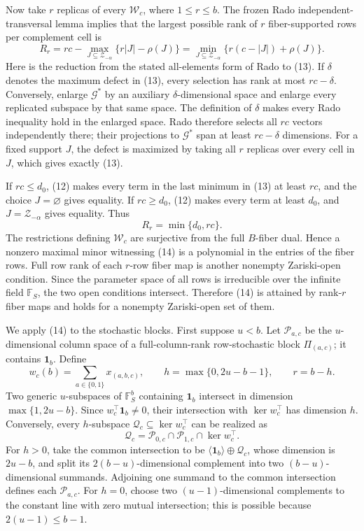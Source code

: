 Now take \(r\) replicas of every \(\mathscr W_c\), where \(1\le r\le b\).
The frozen Rado independent-transversal lemma implies that the largest possible
rank of \(r\) fiber-supported rows per complement cell is
\[
R_r=rc-\max_{J\subseteq\mathcal Z_{-\alpha}}
\{r\lvert J\rvert-\rho(J)\}
=\min_{J\subseteq\mathcal Z_{-\alpha}}
\{r(c-\lvert J\rvert)+\rho(J)\}.
\tag{13}
\]
Here is the reduction from the stated all-elements form of Rado to (13).  If
\(\delta\) denotes the maximum defect in (13), every selection has rank at most
\(rc-\delta\).  Conversely, enlarge \(\mathscr G^*\) by an auxiliary
\(\delta\)-dimensional space and enlarge every replicated subspace by that same
space.  The definition of \(\delta\) makes every Rado inequality hold in the
enlarged space.  Rado therefore selects all \(rc\) vectors independently there;
their projections to \(\mathscr G^*\) span at least \(rc-\delta\) dimensions.
For a fixed support \(J\), the defect is maximized by taking all \(r\) replicas
over every cell in \(J\), which gives exactly (13).

If \(rc\le d_0\), (12) makes every term in the last minimum in (13) at least
\(rc\), and the choice \(J=\varnothing\) gives equality.  If \(rc\ge d_0\),
(12) makes every term at least \(d_0\), and \(J=\mathcal Z_{-\alpha}\) gives
equality.  Thus
\[
R_r=\min\{d_0,rc\}.
\tag{14}
\]
The restrictions defining \(\mathscr W_c\) are surjective from the full
\(B\)-fiber dual.  Hence a nonzero maximal minor witnessing (14) is a polynomial
in the entries of the fiber rows.  Full row rank of each \(r\)-row fiber map is
another nonempty Zariski-open condition.  Since the parameter space of all rows
is irreducible over the infinite field \(\mathbb F_S\), the two open conditions
intersect.  Therefore (14) is attained by rank-\(r\) fiber maps and holds for a
nonempty Zariski-open set of them.

We apply (14) to the stochastic blocks.  First suppose \(u<b\).  Let
\(\mathscr P_{a,c}\) be the \(u\)-dimensional column space of a full-column-rank
row-stochastic block \(\Pi_{(a,c)}\); it contains \(\mathbf 1_b\).  Define
\[
w_c(b)=\sum_{a\in\{0,1\}}x_{(a,b,c)},
\qquad
h=\max\{0,2u-b-1\},
\qquad r=b-h.
\tag{15}
\]
Two generic \(u\)-subspaces of \(\mathbb F_S^b\) containing
\(\mathbf 1_b\) intersect in dimension \(\max\{1,2u-b\}\).  Since
\(w_c^\top\mathbf 1_b\ne0\), their intersection with
\(\ker w_c^\top\) has dimension \(h\).  Conversely, every \(h\)-subspace
\(\mathscr Q_c\subseteq\ker w_c^\top\) can be realized as
\[
\mathscr Q_c
=\mathscr P_{0,c}\cap\mathscr P_{1,c}\cap\ker w_c^\top.
\tag{16}
\]
For \(h>0\), take the common intersection to be
\(\langle\mathbf 1_b\rangle\oplus\mathscr Q_c\), whose dimension is
\(2u-b\), and split its \(2(b-u)\)-dimensional complement into two
\((b-u)\)-dimensional summands.  Adjoining one summand to the common intersection
defines each \(\mathscr P_{a,c}\).  For \(h=0\), choose two
\((u-1)\)-dimensional complements to the constant line with zero mutual
intersection; this is possible because \(2(u-1)\le b-1\).

